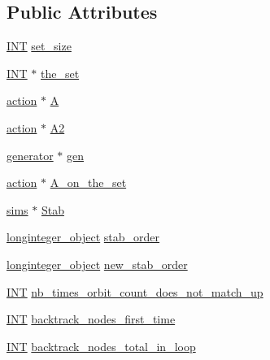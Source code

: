 \subsection*{Public Attributes}
\begin{DoxyCompactItemize}
\item 
\mbox{\hyperlink{galois_8h_a09fddde158a3a20bd2dcadb609de11dc}{I\+NT}} \mbox{\hyperlink{classcompute__stabilizer_ab2a3ff71a820286b77e8c9347bee1f1c}{set\+\_\+size}}
\item 
\mbox{\hyperlink{galois_8h_a09fddde158a3a20bd2dcadb609de11dc}{I\+NT}} $\ast$ \mbox{\hyperlink{classcompute__stabilizer_afcaaf6f7a3c594ad8c6636800345ec29}{the\+\_\+set}}
\item 
\mbox{\hyperlink{classaction}{action}} $\ast$ \mbox{\hyperlink{classcompute__stabilizer_ac09fca4d0aec68157de59fb25c5180f7}{A}}
\item 
\mbox{\hyperlink{classaction}{action}} $\ast$ \mbox{\hyperlink{classcompute__stabilizer_ab797bacaef5f7471cef3470d76bff200}{A2}}
\item 
\mbox{\hyperlink{classgenerator}{generator}} $\ast$ \mbox{\hyperlink{classcompute__stabilizer_a4ef30a6769e54a3dbe455afe8f0a2463}{gen}}
\item 
\mbox{\hyperlink{classaction}{action}} $\ast$ \mbox{\hyperlink{classcompute__stabilizer_ac49e7703aa05563f8e8f96da57bffbab}{A\+\_\+on\+\_\+the\+\_\+set}}
\item 
\mbox{\hyperlink{classsims}{sims}} $\ast$ \mbox{\hyperlink{classcompute__stabilizer_ae5f4fd2320302e802be7308734ce50bc}{Stab}}
\item 
\mbox{\hyperlink{classlonginteger__object}{longinteger\+\_\+object}} \mbox{\hyperlink{classcompute__stabilizer_a3bcebdd2bf2d189adb5c8f5cd778bff3}{stab\+\_\+order}}
\item 
\mbox{\hyperlink{classlonginteger__object}{longinteger\+\_\+object}} \mbox{\hyperlink{classcompute__stabilizer_a16f81dd36d6290c69411b874d0b7d9c1}{new\+\_\+stab\+\_\+order}}
\item 
\mbox{\hyperlink{galois_8h_a09fddde158a3a20bd2dcadb609de11dc}{I\+NT}} \mbox{\hyperlink{classcompute__stabilizer_a0005900690fddb50ce2c803827ae3b1b}{nb\+\_\+times\+\_\+orbit\+\_\+count\+\_\+does\+\_\+not\+\_\+match\+\_\+up}}
\item 
\mbox{\hyperlink{galois_8h_a09fddde158a3a20bd2dcadb609de11dc}{I\+NT}} \mbox{\hyperlink{classcompute__stabilizer_ac67f169061906bfd515b361fb4f719bf}{backtrack\+\_\+nodes\+\_\+first\+\_\+time}}
\item 
\mbox{\hyperlink{galois_8h_a09fddde158a3a20bd2dcadb609de11dc}{I\+NT}} \mbox{\hyperlink{classcompute__stabilizer_a46275d89d5dfa0e26999927144a309da}{backtrack\+\_\+nodes\+\_\+total\+\_\+in\+\_\+loop}}

\end{DoxyCompactItemize}
